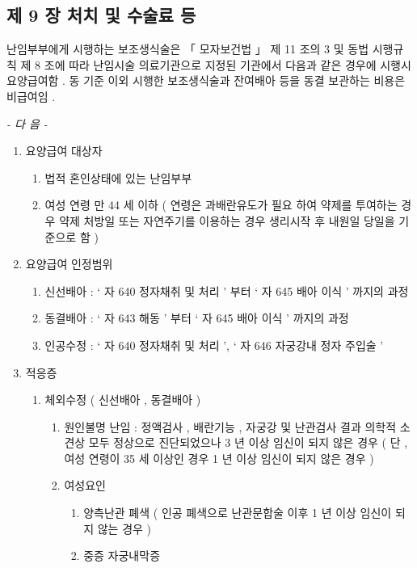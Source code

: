 \subsection{제 9 장 처치 및 수술료 등} 
\par 
난임부부에게 시행하는 보조생식술은  「 모자보건법 」  제 11 조의 3  및 동법 시행규칙 제 8 조에 따라 난임시술 의료기관으로 지정된  기관에서 다음과 같은 경우에 시행시 요양급여함 .  동 기준 이외  시행한 보조생식술과 잔여배아 등을 동결 \cntrdot{} 보관하는 비용은 비급여임 . \par
\emph{-  다 음  -}\par 
\begin{enumerate}[가.]\tightlist
\item 요양급여 대상자  
	\begin{enumerate}[1)]\tightlist
	\item 법적 혼인상태에 있는 난임부부  
	\item 여성 연령 만  44 세 이하 ( 연령은 과배란유도가 필요 하여 약제를 투여하는 경우 약제  처방일 또는 자연주기를  이용하는 경우 생리시작 후 내원일  당일을 기준으로 함 ) 
	\end{enumerate}
\item 요양급여 인정범위 
	\begin{enumerate}[1)]\tightlist
	\item 신선배아 : ‘ 자 640  정자채취 및 처리 ’ 부터  ‘ 자 645  배아 이식 ’ 까지의 과정 
	\item 동결배아 : ‘ 자 643  해동 ’ 부터  ‘ 자 645  배아 이식 ’ 까지의 과정 
	\item 인공수정 : ‘ 자 640  정자채취 및 처리 ’, ‘ 자 646  자궁강내 정자 주입술 ’ 
	\end{enumerate}	
\item 적응증 
	\begin{enumerate}[1)]\tightlist
	\item 체외수정 ( 신선배아 ,  동결배아 )  
		\begin{enumerate}[가)]\tightlist
		\item 원인불명 난임 : 정액검사 ,  배란기능 ,  자궁강 및 난관검사 결과 의학적 소견상 모두 정상으로 진단되었으나  3 년 이상 임신이 되지 않은 경우 ( 단 ,  여성 연령이  35 세 이상인 경우  1 년 이상 임신이 되지 않은 경우 ) 
		\item 여성요인 
			\begin{enumerate}[(1)]\tightlist
			\item 양측난관 폐색  ( 인공 폐색으로 난관문합술 이후  1 년 이상  임신이 되지 않는 경우 ) 
			\item 중증 자궁내막증 

\end{enumerate}
\end{enumerate}
\end{enumerate}
\end{enumerate}
